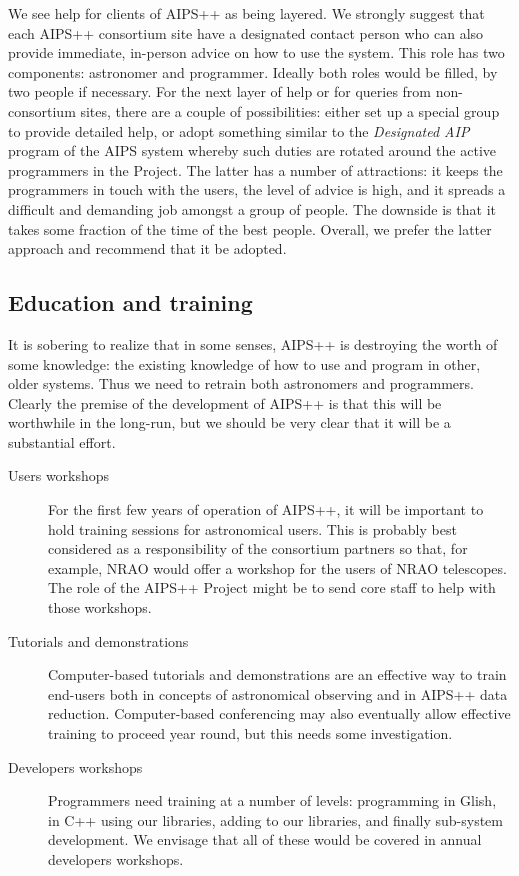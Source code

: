 We see help for clients of AIPS++ as being layered. We strongly
suggest that each AIPS++ consortium site have a designated contact
person who can also provide immediate, in-person advice on how to use
the system. This role has two components: astronomer and programmer.
Ideally both roles would be filled, by two people if necessary. For
the next layer of help or for queries from non-consortium sites, there
are a couple of possibilities: either set up a special group to
provide detailed help, or adopt something similar to the {\em
Designated AIP} program of the AIPS system whereby such duties are
rotated around the active programmers in the Project.  The latter has
a number of attractions: it keeps the programmers in touch with the
users, the level of advice is high, and it spreads a difficult and
demanding job amongst a group of people. The downside is that it takes
some fraction of the time of the best people. Overall, we prefer the
latter approach and recommend that it be adopted.

\subsection{Education and training}

It is sobering to realize that in some senses, AIPS++ is destroying
the worth of some knowledge: the existing knowledge of how to use and
program in other, older systems. Thus we need to retrain both
astronomers and programmers. Clearly the premise of the development of
AIPS++ is that this will be worthwhile in the long-run, but we should
be very clear that it will be a substantial effort.

\begin{description}
\item[Users workshops] For the first few years of operation of
AIPS++, it will be important to hold training sessions for 
astronomical users. This is probably best considered as a responsibility
of the consortium partners so that, for example, NRAO would offer a
workshop for the users of NRAO telescopes. The role of the AIPS++
Project might be to send core staff to help with those workshops.
\item[Tutorials and demonstrations] Computer-based tutorials and
demonstrations are an effective way to train end-users both in
concepts of astronomical observing and in AIPS++ data reduction.
Computer-based conferencing may also eventually allow effective
training to proceed year round, but this needs some investigation.
\item[Developers workshops] Programmers need training at a number of
levels: programming in Glish, in C++ using our libraries, adding to
our libraries, and finally sub-system development. We envisage that
all of these would be covered in annual developers workshops.
\end{description}

